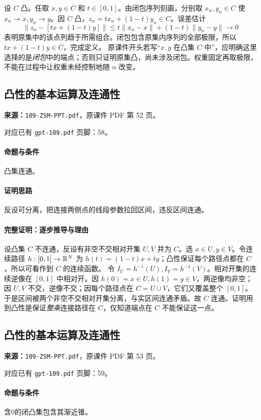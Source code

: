 设 $C$ 凸。任取 $x,y\in\overline C$ 和 $t\in[0,1]$。由闭包序列刻画，分别取 $x_n,y_n\in C$ 使 $x_n\to x,y_n\to y$。因 $C$ 凸，$z_n=tx_n+(1-t)y_n\in C$。误差估计
\[\|z_n-[tx+(1-t)y]\|\le t\|x_n-x\|+(1-t)\|y_n-y\|\to0\]
表明原集中的该点列趋于所需组合。闭包包含原集内序列的全部极限，所以 $tx+(1-t)y\in\overline C$，完成定义。
原课件开头若写“$x,y$ 在凸集 $C$ 中”，应明确这里选择的是\emph{闭包}中的端点；否则只证明原集凸，尚未涉及闭包。权重固定再取极限，不能在过程中让权重未经控制地随 $n$ 改变。

\clearpage\subsection{凸性的基本运算及连通性}
\textbf{来源：}\texttt{109-ZSM-PPT.pdf}，原课件 PDF 第 52 页。\par
对应已有 \texttt{gpt-109.pdf} 页脚：58。\par
\paragraph{命题与条件}凸集连通。
\paragraph{证明思路}反设可分离，把连接两侧点的线段参数拉回区间，违反区间连通。
\paragraph{完整证明：逐步推导与理由}

设凸集 $C$ 不连通，反设有非空不交相对开集 $U,V$ 并为 $C$。选 $x\in U,y\in V$。令连续路径 $h:[0,1]\to\mathbb{R}^N$ 为 $h(t)=(1-t)x+ty$；凸性保证每个路径点都在 $C$，所以可看作到 $C$ 的连续函数。
令 $I_U=h^{-1}(U),I_V=h^{-1}(V)$。相对开集的连续逆像在 $[0,1]$ 中相对开。因 $h(0)=x\in U,h(1)=y\in V$，两逆像均非空；因 $U,V$ 不交，逆像不交；因每个路径点在 $C=U\cup V$，它们又覆盖整个 $[0,1]$。
于是区间被两个非空不交相对开集分离，与实区间连通矛盾。故 $C$ 连通。证明用到凸性是保证\emph{整条}连接路径在 $C$，仅知道端点在 $C$ 不能保证这一点。

\clearpage\subsection{凸性的基本运算及连通性}
\textbf{来源：}\texttt{109-ZSM-PPT.pdf}，原课件 PDF 第 53 页。\par
对应已有 \texttt{gpt-109.pdf} 页脚：59。\par
\paragraph{命题与条件}含0的闭凸集包含其渐近锥。
